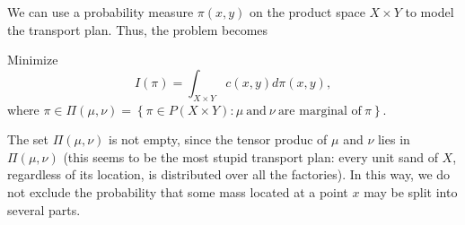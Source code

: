 We can use a probability measure $\pi(x, y)$ on the product space $X \times Y$ to model the transport plan. Thus, the problem becomes 
\begin{problem}\label{pro: Kant}
	Minimize 
	\[
	I(\pi) = \int_{X \times Y} c(x, y) d \pi(x, y) \nonumber,
	\]
	where $\pi \in \Pi(\mu, \nu) = \left\{\pi \in P(X \times Y): \mu \ \text{and} \ \nu \ \text{are marginal of} \ \pi \right\}$.
\end{problem}
\begin{remark}
	The set $\Pi(\mu, \nu)$ is not empty, since the tensor produc of $\mu$ and $\nu$ lies in $\Pi(\mu, \nu)$ (this seems to be the most stupid transport plan: every unit sand of $X$, regardless of its location, is distributed over all the factories). In this way, we do not exclude the probability that some mass located at a point $x$ may be split into several parts. 
\end{remark}


